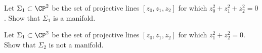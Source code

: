 \begin{alist}
\item Let $\Sigma_1\subset \CP^2$ be the set of projective lines
$[z_0,z_1,z_2]$ for which $z_0^2+z_1^2+z_2^2=0$. Show that $\Sigma_1$
is a manifold.
\item Let $\Sigma_1\subset \CP^2$ be the set of projective lines
$[z_0,z_1,z_2]$ for which $z_1^2+z_2^2=0$. Show that $\Sigma_2$ is not
a manifold.
\end{alist}
